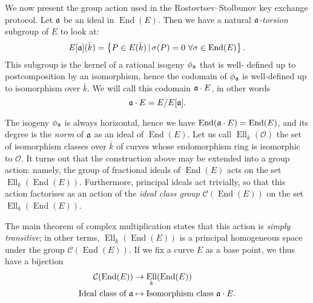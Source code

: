 \documentclass{article}
\newcommand{\Cl}{\mathcal{C}}
\renewcommand{\O}{\mathcal{O}}
\newcommand{\set}[1]{\left\{#1\right\}}
\newcommand{\suchthat}{\,|\,}
\theoremstyle{definition}
\DeclareMathOperator{\End}{End}
\DeclareMathOperator{\Ell}{Ell}
\begin{document}
We now present the group action used in the Rostovtsev--Stolbunov key exchange 
protocol. Let $\frak a$ be an ideal in $\End(E)$. Then we have a natural \emph
{${\frak a}$-torsion} subgroup of $E$ to look at:
\[
E[\frak a](\bar{k}) = \set{P\in E(\bar{k}) \suchthat \sigma(P) = 0\ 
\forall\sigma\in\End(E)}.
\]
This subgroup is the kernel of a rational isogeny $\phi_{\frak a}$ that is well-
defined up to postcomposition by an isomorphism, hence the codomain of $\phi_{
\frak a}$ is well-defined up to isomorphism over $\bar{k}$. We will call this 
codomain $\frak a\cdot E$, in other words
\[
\frak a\cdot E = E/E[\frak a].
\]

The isogeny $\phi_{\frak a}$ is always horizontal, hence we have $\End(\frak a
\cdot E) = \End(E)$, and its degree is the \emph{norm} of $\frak a$ as an ideal 
of $\End(E)$.
Let us call $\Ell_k(\O)$ the set of isomorphism classes over $\bar{k}$ of 
curves whose endomorphism ring is isomorphic to $\O$. It turns out that the 
construction above may be extended into a group action: namely, the group of 
fractional ideals of $\End(E)$ acts on the set $\Ell_k(\End(E))$. Furthermore, 
principal ideals act trivially, so that this action factorises as an action of 
the \emph{ideal class group} $\Cl(\End(E))$ on the set $\Ell_k(\End(E))$.

The main theorem of complex multiplication states that this action is \emph{
simply transitive}; in other terms, $\Ell_k(\End(E))$ is a principal 
homogeneous space under the group $\Cl(\End(E))$. If we fix a curve $E$ as a 
base point, we thus have a bijection
\[
\begin{aligned}
\Cl(\End(E)) &\to \Ell_k(\End(E)) \\
\text{Ideal class of }\frak a &\mapsto \text{Isomorphism class }\frak a\cdot E.
\end{aligned}
\]
\end{document}
